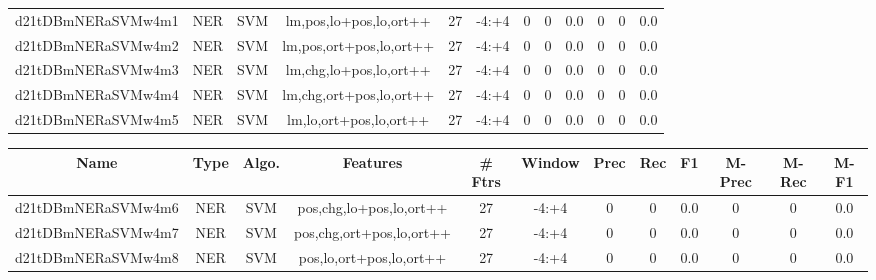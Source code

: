 \documentclass[a4paper]{article}
\begin{document}
\begin{landscape}
\begin{center}
\begin{tabular}{ |c|c|c|c|c|c|c|c|c|c|c|c|}
 
 	
 	\small{ d21tDBmNERaSVMw4m1 } & \small{ NER} & \small{  SVM }  & lm,pos,lo+pos,lo,ort++  &  27 &  \small{  -4:+4 }  &  0 & 0 & 0.0  &  0 & 0 & 0.0 \\
 	

 
 	
 	\small{ d21tDBmNERaSVMw4m2 } & \small{ NER} & \small{  SVM }  & lm,pos,ort+pos,lo,ort++  &  27 &  \small{  -4:+4 }  &  0 & 0 & 0.0  &  0 & 0 & 0.0 \\
 	

 
 	
 	\small{ d21tDBmNERaSVMw4m3 } & \small{ NER} & \small{  SVM }  & lm,chg,lo+pos,lo,ort++  &  27 &  \small{  -4:+4 }  &  0 & 0 & 0.0  &  0 & 0 & 0.0 \\
 	

 
 	
 	\small{ d21tDBmNERaSVMw4m4 } & \small{ NER} & \small{  SVM }  & lm,chg,ort+pos,lo,ort++  &  27 &  \small{  -4:+4 }  &  0 & 0 & 0.0  &  0 & 0 & 0.0 \\
 	

 
 	
 	\small{ d21tDBmNERaSVMw4m5 } & \small{ NER} & \small{  SVM }  & lm,lo,ort+pos,lo,ort++  &  27 &  \small{  -4:+4 }  &  0 & 0 & 0.0  &  0 & 0 & 0.0 \\
 	
 \hline
\end{tabular}
\end{center}




\begin{center}
\begin{tabular}{ |c|c|c|c|c|c|c|c|c|c|c|c|} 
 \hline
 	Name & Type & Algo. & Features & \# Ftrs & Window & Prec & Rec & F1 & M-Prec & M-Rec & M-F1\\
 \hline

 	

 
 	
 	\small{ d21tDBmNERaSVMw4m6 } & \small{ NER} & \small{  SVM }  & pos,chg,lo+pos,lo,ort++  &  27 &  \small{  -4:+4 }  &  0 & 0 & 0.0  &  0 & 0 & 0.0 \\
 	

 
 	
 	\small{ d21tDBmNERaSVMw4m7 } & \small{ NER} & \small{  SVM }  & pos,chg,ort+pos,lo,ort++  &  27 &  \small{  -4:+4 }  &  0 & 0 & 0.0  &  0 & 0 & 0.0 \\
 	

 
 	
 	\small{ d21tDBmNERaSVMw4m8 } & \small{ NER} & \small{  SVM }  & pos,lo,ort+pos,lo,ort++  &  27 &  \small{  -4:+4 }  &  0 & 0 & 0.0  &  0 & 0 & 0.0 \\
 	


\end{tabular}
\end{center}
\end{landscape}
\end{document}
